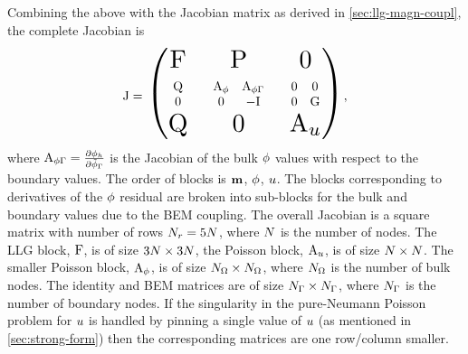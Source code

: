 \newcommand{\Amm}{\Am_\phim}
\newcommand{\Amu}{\Am_\phione}
\newcommand{\zm}{0}
\newcommand{\Abound}{\Am_{\phim\boundd}}

\newcommand{\scalemath}[2]{\scalebox{#1}{\begin{math} {#2} \end{math}}}

\newcommand{\Aprime}{\scalemath{0.5}{\begin{matrix} \Amm     & \Abound \\ \zm      & -\Idm \end{matrix}}}
\newcommand{\Gprime}{\scalemath{0.5}{\begin{matrix} \zm  & \zm \\ \zm  & \bm \end{matrix}}}
\newcommand{\Qprime}{\scalemath{0.5}{\begin{matrix} \Qm \\ \zm \end{matrix}}}


Combining the above with the Jacobian matrix as derived in \cref{sec:llg-magn-coupl}, the complete Jacobian is
\begin{equation}
  \Jm =
  \scalemath{2}{
    \begin{pmatrix}
      \Fm        & \Pm     &  \zm \\
      \Qprime &   \Aprime &  \Gprime  \\
      \Qm       &  \zm       &   \Amu
    \end{pmatrix}
  },
  \label{eq:16}
\end{equation}
where $\Abound = \pd{\phimh}{\phimdis_\boundd}$ is the Jacobian of the bulk $\phi$ values with respect to the boundary values.
The order of blocks is $\boldsymbol{\mathrm{m}}$, $\phi$, $u$.
The blocks corresponding to derivatives of the $\phi$ residual are broken into sub-blocks for the bulk and boundary values due to the BEM coupling.
The overall Jacobian is a square matrix with number of rows $N_r = 5N$, where $N$ is the number of nodes.
The LLG block, $\mathrm{F}$, is of size $3N\times 3N$, the Poisson block, $\Amu$, is of size $N \times N$.
The smaller Poisson block, $\Amm$, is of size $N_\Omega \times N_\Omega$, where $N_\Omega$ is the number of bulk nodes.
The identity and BEM matrices are of size $N_{\Gamma} \times N_{\Gamma}$, where $N_{\Gamma}$ is the number of boundary nodes.
If the singularity in the pure-Neumann Poisson problem for $u$ is handled by pinning a single value of $u$ (as mentioned in \cref{sec:strong-form}) then the corresponding matrices are one row/column smaller.

